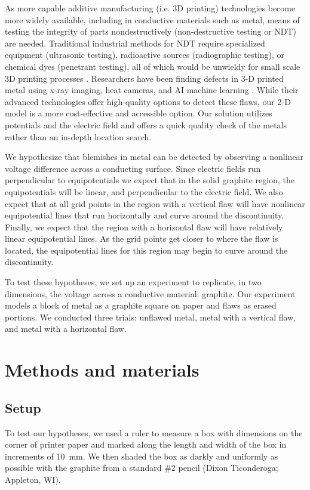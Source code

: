 \documentclass[10pt,journal,twoside]{IEEEtran} %
\begin{document}
As more capable additive manufacturing (i.e. 3D printing) technologies become more widely available, including in conductive materials such as metal, means of testing the integrity of parts nondestructively (non-destructive testing or NDT) are needed. Traditional industrial methods for NDT require specialized equipment (ultrasonic testing), radioactive sources (radiographic testing), or chemical dyes (penetrant testing), all of which would be unwieldy for small scale 3D printing processes \cite{griffiths:2013:introduction,kittel:2004:introduction}. Researchers have been finding defects in 3-D printed metal using x-ray imaging, heat cameras, and AI machine learning \cite{forrester:2023:researchers,loke:2013:recent,hauptmann:2018:revealing}. While their advanced technologies offer high-quality options to detect these flaws, our 2-D model is a more cost-effective and accessible option. Our solution utilizes potentials and the electric field and offers a quick quality check of the metals rather than an in-depth location search.

We hypothesize that blemishes in metal can be detected by observing a nonlinear voltage difference across a conducting surface. Since electric fields run perpendicular to equipotentials we expect that in the solid graphite region, the equipotentials will be linear, and perpendicular to the electric field. We also expect that at all grid points in the region with a vertical flaw will have nonlinear equipotential lines that run horizontally and curve around the discontinuity. Finally, we expect that the region with a horizontal flaw will have relatively linear equipotential lines. As the grid points get closer to where the flaw is located, the equipotential lines for this region may begin to curve around the discontinuity. 

To test these hypotheses, we set up an experiment to replicate, in two dimensions, the voltage across a conductive material: graphite. Our experiment models a block of metal as a graphite square on paper and flaws as erased portions. We conducted three trials: unflawed metal, metal with a vertical flaw, and metal with a horizontal flaw. 






\section{Methods and materials}
\subsection{Setup}
To test our hypotheses, we used a ruler to measure a box with dimensions  on the corner of  printer paper and marked along the length and width of the box in increments of \qty{10}{\milli\meter}. We then shaded the box as darkly and uniformly as possible with the graphite from a standard \#2 pencil (Dixon Ticonderoga; Appleton, WI). 
\end{document}
